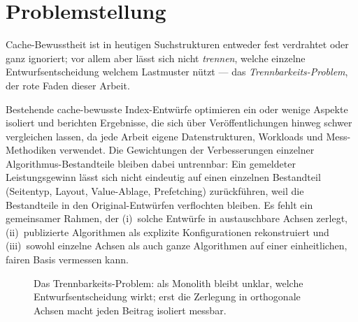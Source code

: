 \section{Problemstellung}\label{sec:problem}
Cache-Bewusstheit ist in heutigen Suchstrukturen entweder fest verdrahtet oder ganz ignoriert; vor allem
aber lässt sich nicht \emph{trennen}, welche einzelne Entwurfsentscheidung welchem Lastmuster nützt --- das
\emph{Trennbarkeits-Problem}, der rote Faden dieser Arbeit.

Bestehende cache-bewusste Index-Entwürfe optimieren ein oder wenige Aspekte isoliert und berichten
Ergebnisse, die sich über Veröffentlichungen hinweg schwer vergleichen lassen, da jede Arbeit eigene
Datenstrukturen, Workloads und Mess-Methodiken verwendet. Die Gewichtungen der Verbesserungen einzelner
Algorithmus-Bestandteile bleiben dabei untrennbar: Ein gemeldeter Leistungsgewinn lässt sich nicht
eindeutig auf einen einzelnen Bestandteil (Seitentyp, Layout, Value-Ablage, Prefetching) zurückführen,
weil die Bestandteile in den Original-Entwürfen verflochten bleiben. Es fehlt ein gemeinsamer Rahmen,
der (i)~solche Entwürfe in austauschbare Achsen zerlegt, (ii)~publizierte Algorithmen als explizite
Konfigurationen rekonstruiert und (iii)~sowohl einzelne Achsen als auch ganze Algorithmen auf einer
einheitlichen, fairen Basis vermessen kann.

\begin{figure}[htbp]\centering
{}
\caption{Das Trennbarkeits-Problem: als Monolith bleibt unklar, welche Entwurfsentscheidung wirkt; erst die Zerlegung in orthogonale Achsen macht jeden Beitrag isoliert messbar.}\label{fig:separability}
\end{figure}

